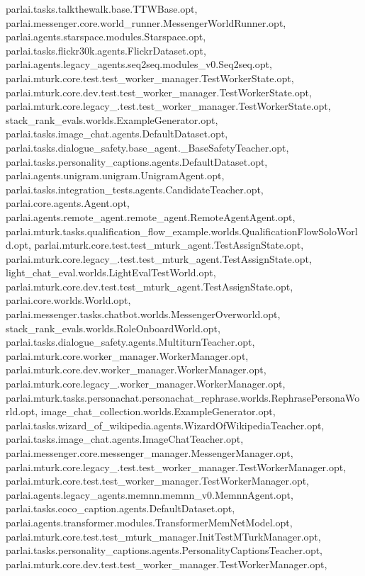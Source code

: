 parlai.\+tasks.\+talkthewalk.\+base.\+T\+T\+W\+Base.\+opt, parlai.\+messenger.\+core.\+world\+\_\+runner.\+Messenger\+World\+Runner.\+opt, parlai.\+agents.\+starspace.\+modules.\+Starspace.\+opt, parlai.\+tasks.\+flickr30k.\+agents.\+Flickr\+Dataset.\+opt, parlai.\+agents.\+legacy\+\_\+agents.\+seq2seq.\+modules\+\_\+v0.\+Seq2seq.\+opt, parlai.\+mturk.\+core.\+test.\+test\+\_\+worker\+\_\+manager.\+Test\+Worker\+State.\+opt, parlai.\+mturk.\+core.\+dev.\+test.\+test\+\_\+worker\+\_\+manager.\+Test\+Worker\+State.\+opt, parlai.\+mturk.\+core.\+legacy\+\_.\+test.\+test\+\_\+worker\+\_\+manager.\+Test\+Worker\+State.\+opt, stack\+\_\+rank\+\_\+evals.\+worlds.\+Example\+Generator.\+opt, parlai.\+tasks.\+image\+\_\+chat.\+agents.\+Default\+Dataset.\+opt, parlai.\+tasks.\+dialogue\+\_\+safety.\+base\+\_\+agent.\+\_\+\+Base\+Safety\+Teacher.\+opt, parlai.\+tasks.\+personality\+\_\+captions.\+agents.\+Default\+Dataset.\+opt, parlai.\+agents.\+unigram.\+unigram.\+Unigram\+Agent.\+opt, parlai.\+tasks.\+integration\+\_\+tests.\+agents.\+Candidate\+Teacher.\+opt, parlai.\+core.\+agents.\+Agent.\+opt, parlai.\+agents.\+remote\+\_\+agent.\+remote\+\_\+agent.\+Remote\+Agent\+Agent.\+opt, parlai.\+mturk.\+tasks.\+qualification\+\_\+flow\+\_\+example.\+worlds.\+Qualification\+Flow\+Solo\+World.\+opt, parlai.\+mturk.\+core.\+test.\+test\+\_\+mturk\+\_\+agent.\+Test\+Assign\+State.\+opt, parlai.\+mturk.\+core.\+legacy\+\_.\+test.\+test\+\_\+mturk\+\_\+agent.\+Test\+Assign\+State.\+opt, light\+\_\+chat\+\_\+eval.\+worlds.\+Light\+Eval\+Test\+World.\+opt, parlai.\+mturk.\+core.\+dev.\+test.\+test\+\_\+mturk\+\_\+agent.\+Test\+Assign\+State.\+opt, parlai.\+core.\+worlds.\+World.\+opt, parlai.\+messenger.\+tasks.\+chatbot.\+worlds.\+Messenger\+Overworld.\+opt, stack\+\_\+rank\+\_\+evals.\+worlds.\+Role\+Onboard\+World.\+opt, parlai.\+tasks.\+dialogue\+\_\+safety.\+agents.\+Multiturn\+Teacher.\+opt, parlai.\+mturk.\+core.\+worker\+\_\+manager.\+Worker\+Manager.\+opt, parlai.\+mturk.\+core.\+dev.\+worker\+\_\+manager.\+Worker\+Manager.\+opt, parlai.\+mturk.\+core.\+legacy\+\_.\+worker\+\_\+manager.\+Worker\+Manager.\+opt, parlai.\+mturk.\+tasks.\+personachat.\+personachat\+\_\+rephrase.\+worlds.\+Rephrase\+Persona\+World.\+opt, image\+\_\+chat\+\_\+collection.\+worlds.\+Example\+Generator.\+opt, parlai.\+tasks.\+wizard\+\_\+of\+\_\+wikipedia.\+agents.\+Wizard\+Of\+Wikipedia\+Teacher.\+opt, parlai.\+tasks.\+image\+\_\+chat.\+agents.\+Image\+Chat\+Teacher.\+opt, parlai.\+messenger.\+core.\+messenger\+\_\+manager.\+Messenger\+Manager.\+opt, parlai.\+mturk.\+core.\+legacy\+\_.\+test.\+test\+\_\+worker\+\_\+manager.\+Test\+Worker\+Manager.\+opt, parlai.\+mturk.\+core.\+test.\+test\+\_\+worker\+\_\+manager.\+Test\+Worker\+Manager.\+opt, parlai.\+agents.\+legacy\+\_\+agents.\+memnn.\+memnn\+\_\+v0.\+Memnn\+Agent.\+opt, parlai.\+tasks.\+coco\+\_\+caption.\+agents.\+Default\+Dataset.\+opt, parlai.\+agents.\+transformer.\+modules.\+Transformer\+Mem\+Net\+Model.\+opt, parlai.\+mturk.\+core.\+test.\+test\+\_\+mturk\+\_\+manager.\+Init\+Test\+M\+Turk\+Manager.\+opt, parlai.\+tasks.\+personality\+\_\+captions.\+agents.\+Personality\+Captions\+Teacher.\+opt, parlai.\+mturk.\+core.\+dev.\+test.\+test\+\_\+worker\+\_\+manager.\+Test\+Worker\+Manager.\+opt, 